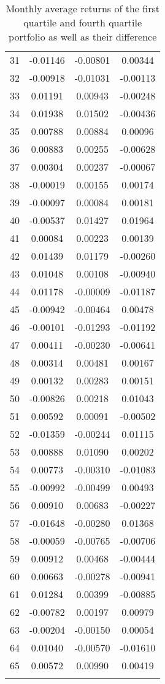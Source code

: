 \documentclass[11pt]{article}
\begin{document}
\begin{longtable}{cccc}
  31 & -0.01146 & -0.00801 & 0.00344 \\ 
  32 & -0.00918 & -0.01031 & -0.00113 \\ 
  33 & 0.01191 & 0.00943 & -0.00248 \\ 
  34 & 0.01938 & 0.01502 & -0.00436 \\ 
  35 & 0.00788 & 0.00884 & 0.00096 \\ 
  36 & 0.00883 & 0.00255 & -0.00628 \\ 
  37 & 0.00304 & 0.00237 & -0.00067 \\ 
  38 & -0.00019 & 0.00155 & 0.00174 \\ 
  39 & -0.00097 & 0.00084 & 0.00181 \\ 
  40 & -0.00537 & 0.01427 & 0.01964 \\ 
  41 & 0.00084 & 0.00223 & 0.00139 \\ 
  42 & 0.01439 & 0.01179 & -0.00260 \\ 
  43 & 0.01048 & 0.00108 & -0.00940 \\ 
  44 & 0.01178 & -0.00009 & -0.01187 \\ 
  45 & -0.00942 & -0.00464 & 0.00478 \\ 
  46 & -0.00101 & -0.01293 & -0.01192 \\ 
  47 & 0.00411 & -0.00230 & -0.00641 \\ 
  48 & 0.00314 & 0.00481 & 0.00167 \\ 
  49 & 0.00132 & 0.00283 & 0.00151 \\ 
  50 & -0.00826 & 0.00218 & 0.01043 \\ 
  51 & 0.00592 & 0.00091 & -0.00502 \\ 
  52 & -0.01359 & -0.00244 & 0.01115 \\ 
  53 & 0.00888 & 0.01090 & 0.00202 \\ 
  54 & 0.00773 & -0.00310 & -0.01083 \\ 
  55 & -0.00992 & -0.00499 & 0.00493 \\ 
  56 & 0.00910 & 0.00683 & -0.00227 \\ 
  57 & -0.01648 & -0.00280 & 0.01368 \\ 
  58 & -0.00059 & -0.00765 & -0.00706 \\ 
  59 & 0.00912 & 0.00468 & -0.00444 \\ 
  60 & 0.00663 & -0.00278 & -0.00941 \\ 
  61 & 0.01284 & 0.00399 & -0.00885 \\ 
  62 & -0.00782 & 0.00197 & 0.00979 \\ 
  63 & -0.00204 & -0.00150 & 0.00054 \\ 
  64 & 0.01040 & -0.00570 & -0.01610 \\ 
  65 & 0.00572 & 0.00990 & 0.00419 \\ 
   \hline
\caption{Monthly average returns of the first quartile and fourth quartile portfolio as well as their difference}\label{tableq1.1}
\end{longtable}
\end{document}
